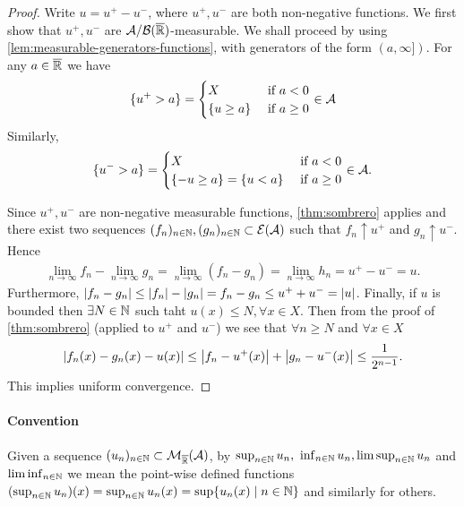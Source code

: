 \begin{proof}
	Write $u = u^+ - u^-$, where $u^+, u^-$ are both non-negative functions. We first show that $u^+, u^-$ are $\mathcal{A}/\mathcal{B}({\overline{\mathbb{R}}})$-measurable. We shall proceed by using \autoref{lem:measurable-generators-functions}, with generators of the form $(a, \infty])$. For any $a \in {\overline{\mathbb{R}}}$ we have
	\begin{align*}
		\{u^+ > a\} = \begin{cases}
		X &\text{ if } a < 0 \\
		\{u \geq a\} &\text{ if } a \geq 0
		\end{cases}\in \mathcal{A}
	\end{align*}
	Similarly,
	\begin{align*}
		\{u^- > a\} = \begin{cases}
		X &\text{ if } a < 0 \\
		\{-u \geq a\} = \{u < a\} &\text{ if } a \geq 0
		\end{cases}
		\in \mathcal{A}.
	\end{align*}
	
	Since $u^+, u^-$ are non-negative measurable functions, \autoref{thm:sombrero} applies and there exist two sequences $(f_n)_{n\in\mathbb{N}}, (g_n)_{n\in\mathbb{N}} \subset \mathcal{E}(\mathcal{A})$ such that $f_n \uparrow u^+$ and $g_n \uparrow u^-$. Hence
	\begin{align*}
		\lim_{n\to \infty} f_n - \lim_{n\to \infty} g_n = \lim_{n\to \infty} (f_n - g_n) = \lim_{n\to \infty} h_n = u^+ - u^- = u.
	\end{align*}
	Furthermore, $\left\vert{f_n - g_n}\right\vert \leq \left\vert{f_n}\right\vert - \left\vert{g_n}\right\vert = f_n - g_n \leq u^+ + u^- = \left\vert{u}\right\vert$. Finally, if $u$ is bounded then $\exists N \in \mathbb{N}$ such taht $u(x) \leq N, \forall x \in X$. Then from the proof of \autoref{thm:sombrero} (applied to $u^+$ and $u^-$) we see that $\forall n \geq N$ and $\forall x \in X$
	\begin{align*}
		\left\vert{f_n(x) - g_n(x) - u(x)}\right\vert \leq \left\vert{f_n - u^+(x)}\right\vert + \left\vert{g_n - u^-(x)}\right\vert \leq \frac{1}{2^{n - 1}}.
	\end{align*}
	This implies uniform convergence.
\end{proof}

\paragraph{Convention} Given a sequence $(u_n)_{n\in\mathbb{N}} \subset \mathcal{M}_{{\overline{\mathbb{R}}}}(\mathcal{A})$, by $\sup_{n\in\mathbb{N}} u_n,\ \inf_{n\in\mathbb{N}} u_n, \limsup_{n\in\mathbb{N}} u_n$ and $\liminf_{n\in\mathbb{N}}$ we mean the point-wise defined functions $(\sup_{n\in\mathbb{N}} u_n)(x) = \sup_{n\in\mathbb{N}} u_n(x) = \sup\{u_n(x) \mid n \in \mathbb{N}\}$ and similarly for others.

